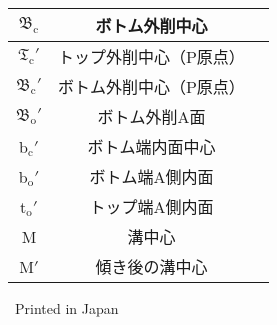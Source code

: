 \begin{longtable}{|c|Sl|}
$\mathfrak B_\mathrm c$ & ボトム外削中心\\\hline
$\mathfrak T_\mathrm c'$ & トップ外削中心（P原点）\\\hline
$\mathfrak B_\mathrm c'$ & ボトム外削中心（P原点）\\\hline
$\mathfrak B_\mathrm o'$ & ボトム外削A面\\\hline
b$_\mathrm c'$ & ボトム端内面中心\\\hline
b$_\mathrm o'$ & ボトム端A側内面\\\hline
t$_\mathrm o'$ & トップ端A側内面\\\hline
M & 溝中心\\\hline
M$'$ & 傾き後の溝中心\\\hline
\end{longtable}




\clearpage
\addchaptertocentry{}{\listfigurename}
\afterpage{\listoffigures\thispagestyle{plainheadback}\clearpage}




\clearpage
\begingroup
\let\cleardoublepage\relax  %
\addchaptertocentry{}{\bibname}
{\footnotesize\printbibliography}
\endgroup




\clearpage
\begingroup
\let\cleardoublepage\relax  %
\addchaptertocentry{}{\indexname}
{\small\printindex}
\endgroup



\thispagestyle{empty}\ \vfill\hfill{\tiny Printed in Japan}

